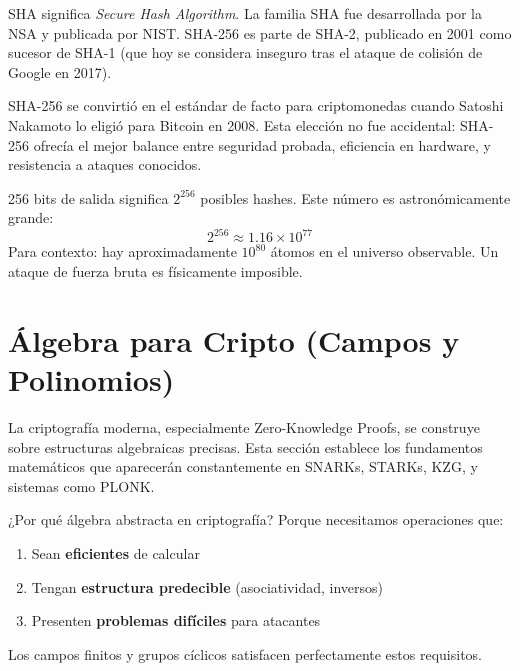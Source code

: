 \documentclass[11pt,a4paper,twoside,openright]{book}
\theoremstyle{definition}
\theoremstyle{plain}
\theoremstyle{remark}
\begin{document}
\begin{intuicion}
SHA significa \textit{Secure Hash Algorithm}. La familia SHA fue desarrollada por la NSA y publicada por NIST. SHA-256 es parte de SHA-2, publicado en 2001 como sucesor de SHA-1 (que hoy se considera inseguro tras el ataque de colisión de Google en 2017).
\end{intuicion}

SHA-256 se convirtió en el estándar de facto para criptomonedas cuando Satoshi Nakamoto lo eligió para Bitcoin en 2008. Esta elección no fue accidental: SHA-256 ofrecía el mejor balance entre seguridad probada, eficiencia en hardware, y resistencia a ataques conocidos.

\begin{clave}
256 bits de salida significa $2^{256}$ posibles hashes. Este número es astronómicamente grande:
\[ 2^{256} \approx 1.16 \times 10^{77} \]
Para contexto: hay aproximadamente $10^{80}$ átomos en el universo observable. Un ataque de fuerza bruta es físicamente imposible.
\end{clave}


\section{Álgebra para Cripto (Campos y Polinomios)}

La criptografía moderna, especialmente Zero-Knowledge Proofs, se construye sobre estructuras algebraicas precisas. Esta sección establece los fundamentos matemáticos que aparecerán constantemente en SNARKs, STARKs, KZG, y sistemas como PLONK.

\begin{intuicion}
¿Por qué álgebra abstracta en criptografía? Porque necesitamos operaciones que:
\begin{enumerate}
    \item Sean \textbf{eficientes} de calcular
    \item Tengan \textbf{estructura predecible} (asociatividad, inversos)
    \item Presenten \textbf{problemas difíciles} para atacantes
\end{enumerate}
Los campos finitos y grupos cíclicos satisfacen perfectamente estos requisitos.
\end{intuicion}
\end{document}
